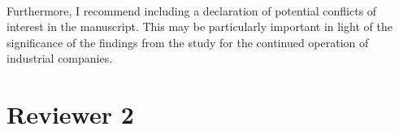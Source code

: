 \documentclass[a4paper,11pt]{article}
\theoremstyle{plain}
\begin{document}
{{    \textit{}

}

~\\[4ex]

\FloatBarrier

Furthermore, I recommend including a declaration of potential conflicts of interest in
the manuscript. This may be particularly important in light of the significance of the
findings from the study for the continued operation of industrial companies.\\[2ex]


}

\clearpage
\section*{Reviewer 2}
\end{document}
